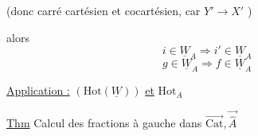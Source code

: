 (donc carré cartésien et cocartésien, car $Y'\longrightarrow X'$ )


alors 
\[
i\in\underline W_A\Rightarrow i'\in\underline W_A
\]
\[
g\in\underline W_A\Rightarrow f\in\underline W_A
\]

 \uline{Application :} $(\mathrm{Hot}(\underline W))$ \uline{et} $\mathrm{Hot}_A$

\uline{Thm} Calcul des fractions à gauche dans $\overrightarrow{\mathrm{Cat}},\overrightarrow{\widehat A}$
